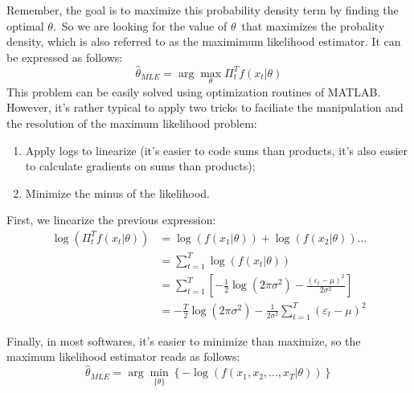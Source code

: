 \documentclass[a4paper,12pt]{article}%
\begin{document}
Remember, the goal is to maximize this probability density term by finding the
optimal $\theta$.\ So we are looking for the value of $\theta$\ that maximizes
the probality density, which is also referred to as the maximimum likelihood
estimator. It can be expressed as follows:%
\[
\hat{\theta}_{MLE}=\arg\max_{\theta}\Pi_{t}^{T}f\left(  x_{t}|\theta\right)
\]
This problem can be easily solved using optimization routines of MATLAB.
However, it's rather typical to apply two tricks to faciliate the manipulation
and the resolution of the maximum likelihood problem:

\begin{enumerate}
\item Apply logs to linearize (it's easier to code sums than products, it's
also easier to calculate gradients on sums than products);

\item Minimize the minus of the likelihood.
\end{enumerate}

First, we linearize the previous expression:%
\begin{align*}
\log(\Pi_{t}^{T}f\left(  x_{t}|\theta\right)  )  &  =\log(f\left(
x_{1}|\theta\right)  )+\log(f\left(  x_{2}|\theta\right)  )...\\
&  =%
{\displaystyle\sum\limits_{t=1}^{T}}
\log(f\left(  x_{t}|\theta\right)  )\\
&  =%
{\displaystyle\sum\limits_{t=1}^{T}}
\left[  -\frac{1}{2}\log(2\pi\sigma^{2})-\frac{\left(  \varepsilon_{t}%
-\mu\right)  ^{2}}{2\sigma^{2}}\right] \\
&  =-\frac{T}{2}\log(2\pi\sigma^{2})-\frac{1}{2\sigma^{2}}%
{\displaystyle\sum\limits_{t=1}^{T}}
\left(  \varepsilon_{t}-\mu\right)  ^{2}%
\end{align*}


Finally, in most softwares, it's easier to minimize than maximize, so the
maximum likelihood estimator reads as follows:%
\begin{equation}
\hat{\theta}_{MLE}=\arg\min_{\{\theta\}}\left\{  -\log(f\left(  x_{1}%
,x_{2},...,x_{T}|\theta\right)  )\right\}
\end{equation}
%

%
\end{document}
